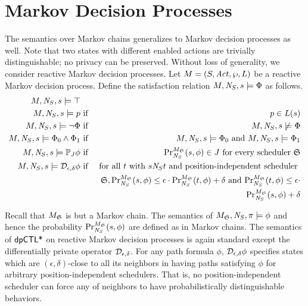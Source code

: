\section{Markov Decision Processes}
The semantics over Markov chains generalizes to Markov decision
processes as well. Note that two states with different enabled actions
are trivially distinguishable; no privacy can be preserved. Without
loss of generality, we consider reactive Markov decision processes.
Let $M = (S, \Act, \wp, L)$ be a reactive Markov
decision process. Define the satisfaction
relation $M, \neighbor{S}, s \models \Phi$ as follows.
\begin{eqnarray*}
  M, \neighbor{S}, s \models \top\\
  M, \neighbor{S}, s \models p
  & \textmd{ if } &
  p \in L(s)\\
  M, \neighbor{S}, s \models \neg \Phi
  & \textmd{ if } &
  M, \neighbor{S}, s \not\models \Phi\\
  M, \neighbor{S}, s \models \Phi_0 \wedge \Phi_1
  & \textmd{ if } &
  M, \neighbor{S}, s \models \Phi_0 \textmd{ and }
  M, \neighbor{S}, s \models \Phi_1\\
  M, \neighbor{S}, s \models \PJ{J} \phi
  & \textmd{ if } &
  \myPr{s}{M_{\scheduler{S}}}{\neighbor{S}}{\phi} \in J
  \textmd{ for every scheduler } \scheduler{S}\\
  M, \neighbor{S}, s \models \dpriv{\epsilon}{\delta} \phi
  & \textmd{ if } &
  \textmd{for all } t \textmd{ with } s \neighbor{S} t \textmd{ and
   position-independent scheduler } \\
  & & \scheduler{S},
   \myPr{s}{M_{\scheduler{S}}}{\neighbor{S}}{\phi} \leq \epsilon \cdot
   \myPr{t}{M_{\scheduler{S}}}{\neighbor{S}}{\phi} + \delta
   \textmd{ and }
   \myPr{t}{M_{\scheduler{S}}}{\neighbor{S}}{\phi} \leq \epsilon \cdot
  \\
  & &
   \myPr{s}{M_{\scheduler{S}}}{\neighbor{S}}{\phi} + \delta
\end{eqnarray*}

Recall that $M_{\scheduler{S}}$ is but a Markov chain. The semantics
of $M_{\scheduler{S}}, \neighbor{S}, \pi \models \phi$ and hence the
probability $\myPr{s}{M_{\scheduler{S}}}{\neighbor{S}}{\phi}$ are
defined as in Markov chains.
The semantics of $\dpCTL$ on reactive Markov decision processes
is again standard except the differentially private operator
$\dpriv{\epsilon}{\delta}$. For any path formula $\phi$,
$\dpriv{\epsilon}{\delta} \phi$ specifies states which are $(\epsilon,
\delta)$-close to all its neighbors in having paths satisfying $\phi$
for arbitrary position-independent schedulers. That is, no
position-independent scheduler can force any of neighbors to have
probabilistically distinguishable behaviors.

